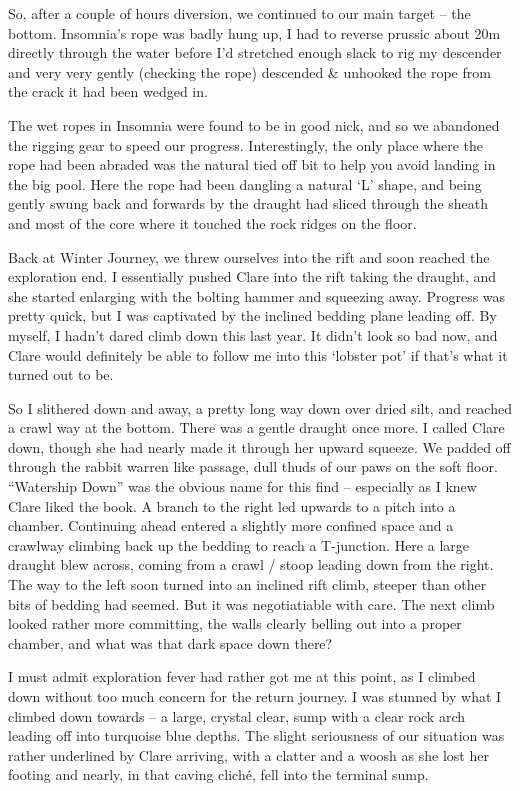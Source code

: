 So, after a couple of hours diversion, we continued to our main target
-- the bottom. Insomnia's rope was badly hung up, I had to reverse
prussic about 20m directly through the water before I'd stretched enough
slack to rig my descender and very very gently (checking the rope)
descended \& unhooked the rope from the crack it had been wedged in.

The wet ropes in Insomnia were found to be in good nick, and so we
abandoned the rigging gear to speed our progress. Interestingly, the
only place where the rope had been abraded was the natural tied off bit
to help you avoid landing in the big pool. Here the rope had been
dangling a natural `L' shape, and being gently swung back and forwards
by the draught had sliced through the sheath and most of the core where
it touched the rock ridges on the floor.

Back at Winter Journey, we threw ourselves into the rift and soon
reached the exploration end. I essentially pushed Clare into the rift
taking the draught, and she started enlarging with the bolting hammer
and squeezing away. Progress was pretty quick, but I was captivated by
the inclined bedding plane leading off. By myself, I hadn't dared climb
down this last year. It didn't look so bad now, and Clare would
definitely be able to follow me into this `lobster pot' if that's what
it turned out to be.

So I slithered down and away, a pretty long way down over dried silt,
and reached a crawl way at the bottom. There was a gentle draught once
more. I called Clare down, though she had nearly made it through her
upward squeeze. We padded off through the rabbit warren like passage,
dull thuds of our paws on the soft floor. ``Watership Down'' was the
obvious name for this find -- especially as I knew Clare liked the book.
A branch to the right led upwards to a pitch into a chamber. Continuing
ahead entered a slightly more confined space and a crawlway climbing
back up the bedding to reach a T-junction. Here a large draught blew
across, coming from a crawl / stoop leading down from the right. The way
to the left soon turned into an inclined rift climb, steeper than other
bits of bedding had seemed. But it was negotiatiable with care. The next
climb looked rather more committing, the walls clearly belling out into
a proper chamber, and what was that dark space down there?

I must admit exploration fever had rather got me at this point, as I
climbed down without too much concern for the return journey. I was
stunned by what I climbed down towards -- a large, crystal clear, sump
with a clear rock arch leading off into turquoise blue depths. The
slight seriousness of our situation was rather underlined by Clare
arriving, with a clatter and a woosh as she lost her footing and nearly,
in that caving cliché, fell into the terminal sump.

